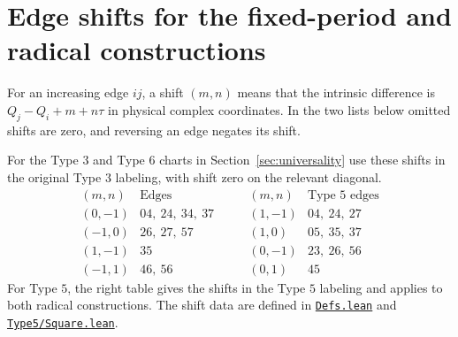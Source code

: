 \documentclass[11pt,letterpaper]{amsart}
\newcommand{\release}{bd3a0e03908481d738df30233cf95c641a1d3f71}
\newcommand{\src}[2]{\href{https://github.com/vltanh/lean4-origami-torus/blob/\release/#1}{\texttt{#2}}}
\begin{document}
\section{Edge shifts for the fixed-period and radical constructions}\label{sec:shifts}

For an increasing edge \(ij\), a shift \((m,n)\) means that the
intrinsic difference is \(Q_j-Q_i+m+n\tau\) in physical complex
coordinates. In the two lists below omitted shifts are zero,
and reversing an edge negates its shift.

For the Type \(3\) and Type \(6\) charts in
Section~\ref{sec:universality} use these shifts in the original
Type \(3\) labeling, with shift zero on the relevant diagonal.
\[
\begin{array}{c|l}
(m,n)&\text{Edges}\\ \hline
(0,-1)&04,\ 24,\ 34,\ 37\\
(-1,0)&26,\ 27,\ 57\\
(1,-1)&35\\
(-1,1)&46,\ 56
\end{array}
\qquad
\begin{array}{c|l}
(m,n)&\text{Type \(5\) edges}\\ \hline
(1,-1)&04,\ 24,\ 27\\
(1,0)&05,\ 35,\ 37\\
(0,-1)&23,\ 26,\ 56\\
(0,1)&45
\end{array}
\]
For Type \(5\), the right table gives the shifts in the Type \(5\)
labeling and applies to both radical constructions. The
shift data are defined in
\src{OrigamiTorus/Defs.lean}{Defs.lean} and
\src{OrigamiTorus/EightVertex/Type5/Square.lean}{Type5/Square.lean}.
\end{document}

